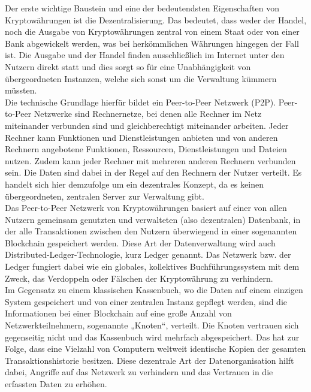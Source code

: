 Der erste wichtige Baustein und eine der bedeutendsten Eigenschaften von Kryptowährungen ist die Dezentralisierung. Das bedeutet, dass weder der Handel, noch die Ausgabe von Kryptowährungen zentral von einem Staat oder von einer Bank abgewickelt werden, was bei herkömmlichen Währungen hingegen der Fall ist. Die Ausgabe und der Handel finden ausschließlich im Internet unter den Nutzern direkt statt und dies sorgt so für eine Unabhängigkeit von übergeordneten Instanzen, welche sich sonst um die Verwaltung kümmern müssten.\\
Die technische Grundlage hierfür bildet ein Peer-to-Peer Netzwerk (P2P). Peer-to-Peer Netzwerke sind Rechnernetze, bei denen alle Rechner im Netz miteinander verbunden sind und gleichberechtigt miteinander arbeiten. Jeder Rechner kann Funktionen und Dienstleistungen anbieten und von anderen Rechnern angebotene Funktionen, Ressourcen, Dienstleistungen und Dateien nutzen. Zudem kann jeder Rechner mit mehreren anderen Rechnern verbunden sein. Die Daten sind dabei in der Regel auf den Rechnern der Nutzer verteilt. Es handelt sich hier demzufolge um ein dezentrales Konzept, da es keinen übergeordneten, zentralen Server zur Verwaltung gibt.\\
Das Peer-to-Peer Netzwerk von Kryptowährungen basiert auf einer von allen Nutzern gemeinsam genutzten und verwalteten (also dezentralen) Datenbank, in der alle Transaktionen zwischen den Nutzern überwiegend in einer sogenannten Blockchain gespeichert werden. Diese Art der Datenverwaltung wird auch Distributed-Ledger-Technologie, kurz Ledger genannt. Das Netzwerk bzw. der Ledger fungiert dabei wie ein globales, kollektives Buchführungssystem mit dem Zweck, das Verdoppeln oder Fälschen der Kryptowährung zu verhindern.\\
Im Gegensatz zu einem klassischen Kassenbuch, wo die Daten auf einem einzigen System gespeichert und von einer zentralen Instanz gepflegt werden, sind die Informationen bei einer Blockchain auf eine große Anzahl von Netzwerkteilnehmern, sogenannte „Knoten“, verteilt. Die Knoten vertrauen sich gegenseitig nicht und das Kassenbuch wird mehrfach abgespeichert. Das hat zur Folge, dass eine Vielzahl von Computern weltweit identische Kopien der gesamten Transaktionshistorie besitzen. Diese dezentrale Art der Datenorganisation hilft dabei, Angriffe auf das Netzwerk zu verhindern und das Vertrauen in die erfassten Daten zu erhöhen.